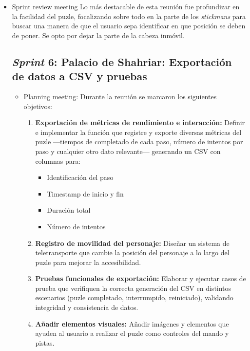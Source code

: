 \begin{itemize}
\item {Sprint review meeting}
Lo más destacable de esta reunión fue profundizar en la facilidad del puzle, focalizando sobre todo en la parte de los \textit{stickmans} para buscar una manera de que el usuario sepa identificar en que posición se deben de poner. Se opto por dejar la parte de la cabeza inmóvil. 

\subsection{\textbf{\textit{Sprint} 6: Palacio de Shahriar: Exportación de datos a CSV y pruebas }}
\begin{itemize}
\item {Planning meeting}:
Durante la reunión se marcaron los siguientes objetivos:

\begin{enumerate}
  \item \textbf{Exportación de métricas de rendimiento e interacción:}  
    Definir e implementar la función que registre y exporte diversas métricas del puzle —tiempos de completado de cada paso, número de intentos por paso y cualquier otro dato relevante— generando un CSV con columnas para:
    \begin{itemize}
      \item Identificación del paso
      \item Timestamp de inicio y fin
      \item Duración total
      \item Número de intentos
    \end{itemize}

  \item \textbf{Registro de movilidad del personaje:}  
    Diseñar un sistema de teletransporte que cambie la posición del personaje a lo largo del puzle para mejorar la accesibilidad.

  \item \textbf{Pruebas funcionales de exportación:}  
    Elaborar y ejecutar casos de prueba que verifiquen la correcta generación del CSV en distintos escenarios (puzle completado, interrumpido, reiniciado), validando integridad y consistencia de datos.
    
   \item \textbf{Añadir elementos visuales:}
   Añadir imágenes y elementos que ayuden al usuario a realizar el puzle como controles del mando y pistas.
   
\end{enumerate}


\end{itemize}
\end{itemize}
